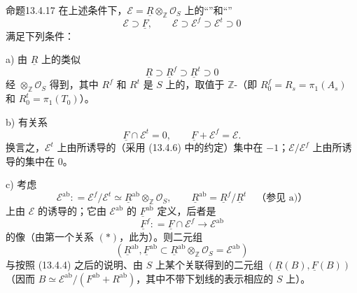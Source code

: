 \begin{SGAresult}{命题}{13.4.17}
在上述条件下，$\mathscr E=\underline R\otimes_{\mathbb Z}\mathcal O_S$ 上的“”和“”
\begin{equation}
 \mathscr E\supset\underline F,\qquad
 \mathscr E\supset\mathscr E^f\supset\mathscr E^t\supset0
 \tag{13.4.17.1}
\end{equation}
满足下列条件：

\textup{a)} 由 $\underline R$ 上的类似
\[
 \underline R\supset\underline R^f\supset\underline R^t\supset0
\]
经 $\otimes_{\mathbb Z}\mathcal O_S$ 得到，其中 $R^f$ 和 $R^t$ 是 $S$ 上的，取值于 $\mathbb Z$-（即 $R^f_0=R_s=\pi_1(A_s)$ 和 $R^t_0=\pi_1(T_0)$）。

\textup{b)} 有关系
\begin{equation}
 \underline F\cap\mathscr E^t=0,\qquad
 \underline F+\mathscr E^f=\mathscr E.
 \tag{*}
\end{equation}
换言之，$\mathscr E^t$ 上由所诱导的（采用 (13.4.6) 中的约定）集中在 $-1$；$\mathscr E/\mathscr E^f$ 上由所诱导的集中在 $0$。

\textup{c)} 考虑
\[
 \mathscr E^{\mathrm{ab}}\mathrel{\mathop:}=\mathscr E^f/\mathscr E^t
 \simeq\underline R^{\mathrm{ab}}\otimes_{\mathbb Z}\mathcal O_S,
 \qquad\underline R^{\mathrm{ab}}=\underline R^f/\underline R^t
 \quad\text{（参见 a)）}
\]
上由 $\mathscr E$ 的诱导的；它由 $\mathscr E^{\mathrm{ab}}$ 的 $\underline F^{\mathrm{ab}}$ 定义，后者是
\[
 \underline F^f\mathrel{\mathop:}=\underline F\cap\mathscr E^f
 \longrightarrow\mathscr E^{\mathrm{ab}}
\]
的像（由第一个关系 $(*)$，此为）。则二元组
\[
 (\underline R^{\mathrm{ab}},
 \underline F^{\mathrm{ab}}\subset
 \underline R^{\mathrm{ab}}\otimes_{\mathbb Z}\mathcal O_S=\mathscr E^{\mathrm{ab}})
\]
与按照 (13.4.4) 之后的说明、由 $S$ 上某个关联得到的二元组 $(\underline R(B),\underline F(B))$ （因而 $B\simeq\mathscr E^{\mathrm{ab}}/(F^{\mathrm{ab}}+R^{\mathrm{ab}})$，其中不带下划线的表示相应的 $S$ 上）。
\end{SGAresult}

